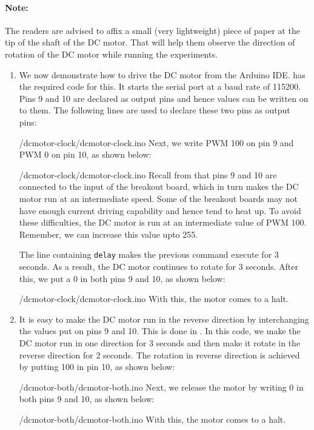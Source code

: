 \paragraph{Note:} The readers are advised to affix a small 
(very lightweight) piece of paper at the tip of the shaft of the DC motor. 
That will help them observe the direction of rotation 
of the DC motor while running the experiments. 

\begin{enumerate}
  \item We now demonstrate how to drive the DC motor from the Arduino
        IDE.   has the required code for this.  It
        starts the serial port at a baud rate of 115200.  Pins 9 and 10 are
        declared as output pins and hence values can be written on to them. The following 
        lines are used to declare these two pins as output pins: 
        
        {\LocDCMardcode/dcmotor-clock/dcmotor-clock.ino}
        Next, we write PWM 100 on pin 9 and PWM 0 on pin 10, as shown below:
        
        {\LocDCMardcode/dcmotor-clock/dcmotor-clock.ino}
        Recall from  that pins 9 and 10 are connected to the
        input of the breakout board, which in turn makes the DC motor run at
        an intermediate speed.  Some of the breakout boards may not have enough current driving
        capability and hence tend to heat up.  To avoid these difficulties,
        the DC motor is run at an intermediate value of PWM 100. Remember, we can 
        increase this value upto 255. 
        
        The line containing {\tt delay} makes the previous command execute
        for 3 seconds.  As a result, the DC motor continues to rotate for 3
        seconds.  After this, we put a 0 in both pins 9 and 10, as shown below:
        
        {\LocDCMardcode/dcmotor-clock/dcmotor-clock.ino}
        With this, the motor comes to a halt.  
        
  \item It is easy to make the DC motor run in the reverse direction by
        interchanging the values put on pins 9 and 10.  This is done in
        .  In this code, we make the DC motor
        run in one direction for 3 seconds and then make it rotate in the
        reverse direction for 2 seconds.  The rotation in reverse direction
        is achieved by putting 100 in pin 10, as shown below:
        
        {\LocDCMardcode/dcmotor-both/dcmotor-both.ino}
        Next, we release the motor by writing 0 in both pins 9 and 10, as shown below:
        
        {\LocDCMardcode/dcmotor-both/dcmotor-both.ino}
        With this, the motor comes to a halt.  
        

\end{enumerate}
